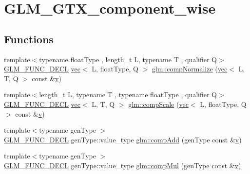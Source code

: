 \hypertarget{group__gtx__component__wise}{}\section{G\+L\+M\+\_\+\+G\+T\+X\+\_\+component\+\_\+wise}
\label{group__gtx__component__wise}
\subsection*{Functions}
\begin{DoxyCompactItemize}
\item 
{\footnotesize template$<$typename float\+Type , length\+\_\+t L, typename T , qualifier Q$>$ }\\\mbox{\hyperlink{setup_8hpp_ab2d052de21a70539923e9bcbf6e83a51}{G\+L\+M\+\_\+\+F\+U\+N\+C\+\_\+\+D\+E\+CL}} \mbox{\hyperlink{structglm_1_1vec}{vec}}$<$ L, float\+Type, Q $>$ \mbox{\hyperlink{group__gtx__component__wise_ga8f2b81ada8515875e58cb1667b6b9908}{glm\+::comp\+Normalize}} (\mbox{\hyperlink{structglm_1_1vec}{vec}}$<$ L, T, Q $>$ const \&\mbox{\hyperlink{_s_d_l__opengl_8h_a10a82eabcb59d2fcd74acee063775f90}{v}})
\item 
{\footnotesize template$<$length\+\_\+t L, typename T , typename float\+Type , qualifier Q$>$ }\\\mbox{\hyperlink{setup_8hpp_ab2d052de21a70539923e9bcbf6e83a51}{G\+L\+M\+\_\+\+F\+U\+N\+C\+\_\+\+D\+E\+CL}} \mbox{\hyperlink{structglm_1_1vec}{vec}}$<$ L, T, Q $>$ \mbox{\hyperlink{group__gtx__component__wise_ga80abc2980d65d675f435d178c36880eb}{glm\+::comp\+Scale}} (\mbox{\hyperlink{structglm_1_1vec}{vec}}$<$ L, float\+Type, Q $>$ const \&\mbox{\hyperlink{_s_d_l__opengl_8h_a10a82eabcb59d2fcd74acee063775f90}{v}})
\item 
{\footnotesize template$<$typename gen\+Type $>$ }\\\mbox{\hyperlink{setup_8hpp_ab2d052de21a70539923e9bcbf6e83a51}{G\+L\+M\+\_\+\+F\+U\+N\+C\+\_\+\+D\+E\+CL}} gen\+Type\+::value\+\_\+type \mbox{\hyperlink{group__gtx__component__wise_gaf71833350e15e74d31cbf8a3e7f27051}{glm\+::comp\+Add}} (gen\+Type const \&\mbox{\hyperlink{_s_d_l__opengl_8h_a10a82eabcb59d2fcd74acee063775f90}{v}})
\item 
{\footnotesize template$<$typename gen\+Type $>$ }\\\mbox{\hyperlink{setup_8hpp_ab2d052de21a70539923e9bcbf6e83a51}{G\+L\+M\+\_\+\+F\+U\+N\+C\+\_\+\+D\+E\+CL}} gen\+Type\+::value\+\_\+type \mbox{\hyperlink{group__gtx__component__wise_gae8ab88024197202c9479d33bdc5a8a5d}{glm\+::comp\+Mul}} (gen\+Type const \&\mbox{\hyperlink{_s_d_l__opengl_8h_a10a82eabcb59d2fcd74acee063775f90}{v}})

\end{DoxyCompactItemize}
